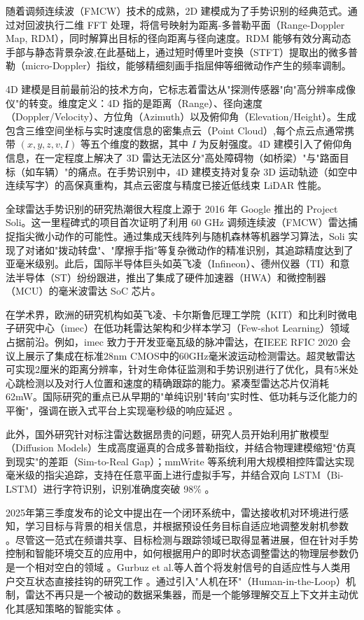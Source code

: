 随着调频连续波（FMCW）技术的成熟，2D 建模成为了手势识别的经典范式。通过对回波执行二维 FFT 处理，将信号映射为距离-多普勒平面（Range-Doppler Map, RDM），同时解算出目标的径向距离与径向速度。RDM 能够有效分离动态手部与静态背景杂波,在此基础上，通过短时傅里叶变换（STFT）提取出的微多普勒（micro-Doppler）指纹，能够精细刻画手指屈伸等细微动作产生的频率调制\cite{1603402}。

4D 建模是目前最前沿的技术方向，它标志着雷达从"探测传感器"向"高分辨率成像仪"的转变。维度定义：4D 指的是距离（Range）、径向速度（Doppler/Velocity）、方位角（Azimuth）以及俯仰角（Elevation/Height）。生成包含三维空间坐标与实时速度信息的密集点云（Point Cloud）,每个点云点通常携带 $(x, y, z, v, I)$ 等五个维度的数据，其中 $I$ 为反射强度。4D 建模引入了俯仰角信息，在一定程度上解决了 3D 雷达无法区分"高处障碍物（如桥梁）"与"路面目标（如车辆）"的痛点。在手势识别中，4D 建模支持对复杂 3D 运动轨迹（如空中连续写字）的高保真重构，其点云密度与精度已接近低线束 LiDAR 性能。

全球雷达手势识别的研究热潮很大程度上源于 2016 年 Google 推出的 Project Soli。这一里程碑式的项目首次证明了利用 60 GHz 调频连续波（FMCW）雷达捕捉指尖微小动作的可能性。通过集成天线阵列与随机森林等机器学习算法，Soli 实现了对诸如"拨动转盘"、"摩擦手指"等复杂微动作的精准识别，其追踪精度达到了亚毫米级别。此后，国际半导体巨头如英飞凌（Infineon）、德州仪器（TI）和意法半导体（ST）纷纷跟进，推出了集成了硬件加速器（HWA）和微控制器（MCU）的毫米波雷达 SoC 芯片。

在学术界，欧洲的研究机构如英飞凌、卡尔斯鲁厄理工学院（KIT）和比利时微电子研究中心（imec）在低功耗雷达架构和少样本学习（Few-shot Learning）领域占据前沿\cite{withmetaL}\cite{9722880}。例如，imec 致力于开发亚毫瓦级的脉冲雷达，在IEEE RFIC 2020 会议上展示了集成在标准28nm CMOS中的60GHz毫米波运动检测雷达。超灵敏雷达可实现2厘米的距离分辨率，针对生命体征监测和手势识别进行了优化，具有5米处心跳检测以及对行人位置和速度的精确跟踪的能力。紧凑型雷达芯片仅消耗62mW\cite{imec}。国际研究的重点已从早期的"单纯识别"转向"实时性、低功耗与泛化能力的平衡"，强调在嵌入式平台上实现毫秒级的响应延迟 。

此外，国外研究针对标注雷达数据昂贵的问题，研究人员开始利用扩散模型（Diffusion Models）生成高度逼真的合成多普勒指纹，并结合物理建模缩短"仿真到现实"的差距（Sim-to-Real Gap）\cite{wu2024cross}；mmWrite 等系统利用大规模相控阵雷达实现毫米级的指尖追踪，支持在任意平面上进行虚拟手写，并结合双向 LSTM（Bi-LSTM）进行字符识别，识别准确度突破 98\% \cite{regani2021mmwrite}。

2025年第三季度发布的论文中提出在一个闭环系统中，雷达接收机对环境进行感知，学习目标与背景的相关信息，并根据预设任务目标自适应地调整发射机参数 。尽管这一范式在频谱共享、目标检测与跟踪领域已取得显著进展，但在针对手势控制和智能环境交互的应用中，如何根据用户的即时状态调整雷达的物理层参数仍是一个相对空白的领域 。Gurbuz et al.等人首个将发射信号的自适应性与人类用户交互状态直接挂钩的研究工作 。通过引入"人机在环"（Human-in-the-Loop）机制，雷达不再只是一个被动的数据采集器，而是一个能够理解交互上下文并主动优化其感知策略的智能实体 \cite{Gesture-basedHuman-in-the-LoopInteractionwithFully-AdaptiveRadar}。

